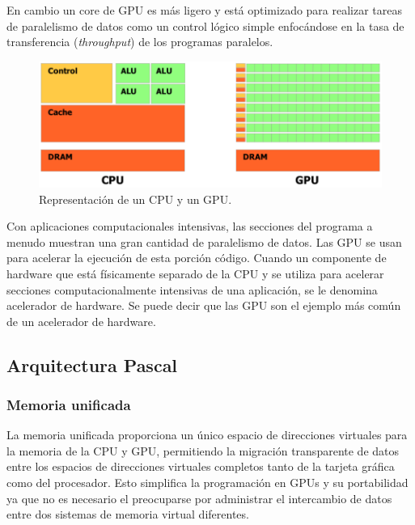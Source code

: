     \vspace{0.3cm}
    En cambio un core de GPU es más ligero y está optimizado para realizar tareas de paralelismo de datos como un control lógico simple enfocándose en la tasa de transferencia (\textit{throughput}) de los programas paralelos.
    
        \begin{figure}[ht]
      \centering
        \includegraphics[scale=0.35]{img/repCPUGPU}
        \caption{Representación de un CPU y un GPU\cite{NCUDA}.}
        \label{fig:gpgpu}
    \end{figure}
    
    \vspace{0.3cm}
    Con aplicaciones computacionales intensivas, las secciones del programa a menudo muestran una gran cantidad de paralelismo de datos. Las GPU se usan para acelerar la ejecución de esta porción código. Cuando un componente de hardware que está físicamente separado de la CPU y se utiliza para acelerar secciones computacionalmente intensivas de una aplicación, se le denomina acelerador de hardware. Se puede decir que las GPU son el ejemplo más común de un acelerador de hardware.

    \subsection{Arquitectura Pascal}

     
    \subsubsection{Memoria unificada} 
     La memoria unificada proporciona un único espacio de direcciones virtuales para la memoria de la CPU y GPU, permitiendo la migración transparente de datos entre los espacios de direcciones virtuales completos tanto de la tarjeta gráfica como del procesador. Esto simplifica la programación en GPUs y su portabilidad ya que no es necesario el  preocuparse por administrar el intercambio de datos entre dos sistemas de memoria virtual diferentes\cite{WPNV}.
     

